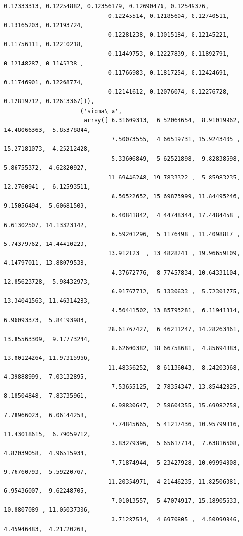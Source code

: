 \documentclass[11pt]{article}
\begin{document}
\begin{Verbatim}[commandchars=\\\{\}]
                              0.12333313, 0.12254882, 0.12356179, 0.12690476, 0.12549376,
                              0.12245514, 0.12185604, 0.12740511, 0.13165203, 0.12193724,
                              0.12281238, 0.13015184, 0.12145221, 0.11756111, 0.12210218,
                              0.11449753, 0.12227839, 0.11892791, 0.12148287, 0.1145338 ,
                              0.11766983, 0.11817254, 0.12424691, 0.11746901, 0.12268774,
                              0.12141612, 0.12076074, 0.12276728, 0.12819712, 0.12613367])),
                      ('sigma\_a',
                       array([ 6.31609313,  6.52064654,  8.91019962, 14.48066363,  5.85378844,
                               7.50073555,  4.66519731, 15.9243405 , 15.27181073,  4.25212428,
                               5.33606849,  5.62521898,  9.82838698,  5.86755372,  4.62820927,
                              11.69446248, 19.7833322 ,  5.85983235, 12.2760941 ,  6.12593511,
                               8.50522652, 15.69873999, 11.84495246,  9.15056494,  5.60681509,
                               6.40841842,  4.44748344, 17.4484458 ,  6.61302507, 14.13323142,
                               6.59201296,  5.1176498 , 11.4098817 ,  5.74379762, 14.44410229,
                              13.912123  , 13.4828241 , 19.96659109,  4.14797011, 13.88079538,
                               4.37672776,  8.77457834, 10.64331104, 12.85623728,  5.98432973,
                               6.91767712,  5.1330633 ,  5.72301775, 13.34041563, 11.46314283,
                               4.50441502, 13.85793281,  6.11941814,  6.96093373,  5.84193983,
                              28.61767427,  6.46211247, 14.28263461, 13.85563309,  9.17773244,
                               8.62600382, 18.66758681,  4.85694883, 13.80124264, 11.97315966,
                              11.48356252,  8.61136043,  8.24203968,  4.39888999,  7.03132895,
                               7.53655125,  2.78354347, 13.85442825,  8.18504848,  7.83735961,
                               6.98830647,  2.58604355, 15.69982758,  7.78966023,  6.06144258,
                               7.74845665,  5.41217436, 10.95799816, 11.43018615,  6.79059712,
                               3.83279396,  5.65617714,  7.63816608,  4.82039058,  4.96515934,
                               7.71874944,  5.23427928, 10.09994008,  9.76760793,  5.59220767,
                              11.20354971,  4.21446235, 11.82506381,  6.95436007,  9.62248705,
                               7.01013557,  5.47074917, 15.18905633, 10.8807089 , 11.05037306,
                               3.71287514,  4.6970805 ,  4.50999046,  4.45946483,  4.21720268,

\end{Verbatim}
\end{document}
